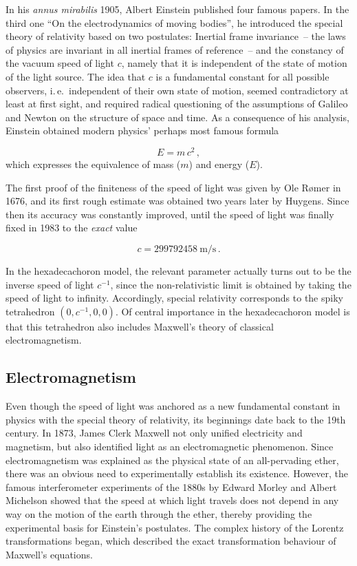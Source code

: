
\newpage {}
\label{sec:0100}

In his \emph{annus mirabilis} 1905, Albert Einstein published four famous papers. In the third one \enquote{On the electrodynamics of moving bodies}, he introduced the special theory of relativity based on two postulates: Inertial frame invariance~-- the laws of physics are invariant in all inertial frames of reference~-- and the constancy of the vacuum speed of light $c$, namely that it is independent of the state of motion of the light source. The idea that $c$ is a fundamental constant for all possible observers, i.\,e.\ independent of their own state of motion, seemed contradictory at least at first sight, and required radical questioning of the assumptions of Galileo and Newton on the structure of space and time. As a consequence of his analysis, Einstein obtained modern physics' perhaps most famous formula

\begin{equation*}\label{emc2}
  E=m\,c^2\,,
\end{equation*}
%
which expresses the equivalence of mass ($m$) and energy ($E$).

The first proof of the finiteness of the speed of light was given by Ole Rømer in 1676, and its first rough estimate was obtained two years later by Huygens. Since then its accuracy was constantly improved, until the speed of light was finally fixed in 1983 to the \emph{exact} value

\begin{equation*}
  c=\SI{299 792 458}{\meter \per \second}\,.
\end{equation*}

In the hexadecachoron model, the relevant parameter actually turns out to be the inverse speed of light $c^{-1}$, since the non-relativistic limit is obtained by taking the speed of light to infinity. Accordingly, special relativity corresponds to the spiky tetrahedron $(0, c^{-1}, 0, 0)$. Of central importance in the hexadecachoron model is that this tetrahedron also includes Maxwell's theory of classical electromagnetism.


\subsection*{Electromagnetism}

Even though the speed of light was anchored as a new fundamental constant in physics with the special theory of relativity, its beginnings date back to the 19th century. In 1873, James Clerk Maxwell not only unified electricity and magnetism, but also identified light as an electromagnetic phenomenon. Since electromagnetism was explained as the physical state of an all-pervading ether, there was an obvious need to experimentally establish its existence. However, the famous interferometer experiments of the 1880s by Edward Morley and Albert Michelson showed that the speed at which light travels does not depend in any way on the motion of the earth through the ether, thereby providing the experimental basis for Einstein's postulates. The complex history of the Lorentz transformations began, which described the exact transformation behaviour of Maxwell's equations.


